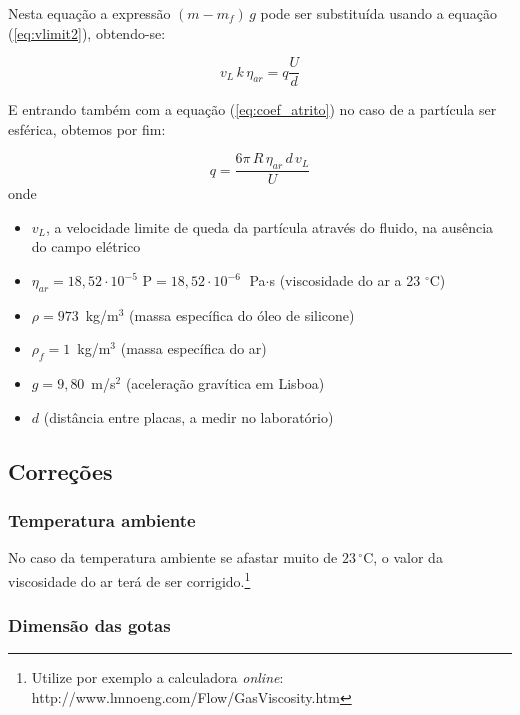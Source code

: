 \documentclass[a4paper,twoside,12pt]{article}      %
\begin{document}
    Nesta equação a expressão $(m - m_f)\,g$ pode ser substituída usando a equação (\ref{eq:vlimit2}), obtendo-se:

    \begin{equation*}
        v_L\, k\, \eta_{ar} = q \frac{U}{d}
    \end{equation*}

    E entrando também com a equação (\ref{eq:coef_atrito}) no caso de a partícula ser esférica, obtemos por fim:

    \begin{equation}
        \label{eq:carga}
        q = \frac{6 \pi \, R \, \eta_{ar} \, d\, v_L}{U}  
    \end{equation}
    onde

    \begin{itemize}
        \item $v_L$, a velocidade limite de queda da partícula através do fluido, na ausência do campo elétrico
        \item $\eta_{ar} = 18,52 \cdot 10^{-5}$ P$ =  18,52 \cdot 10^{-6} \;$ Pa$\cdot$s (viscosidade do ar a 23 $^{\circ}$C)
        \item $\rho = 973 \,$ kg/m$^{3}$ (massa específica do óleo de silicone)
        \item $\rho_f = 1 \,$ kg/m$^{3}$ (massa específica do ar)
        \item $g=9,80\,$ m/s$^{2}$ (aceleração gravítica em Lisboa)
        \item $d$ (distância entre placas, a medir no laboratório)
    \end{itemize}

    \subsection{\sf Correções}
    \subsubsection{\sf Temperatura ambiente}

    No caso da temperatura ambiente se afastar muito de $23\,^{\circ}\mathrm{C}$, o valor  da viscosidade do ar terá de ser corrigido.\footnote{Utilize por exemplo a calculadora \emph{online}: http://www.lmnoeng.com/Flow/GasViscosity.htm}

\subsubsection{\sf Dimensão das gotas}
\end{document}
